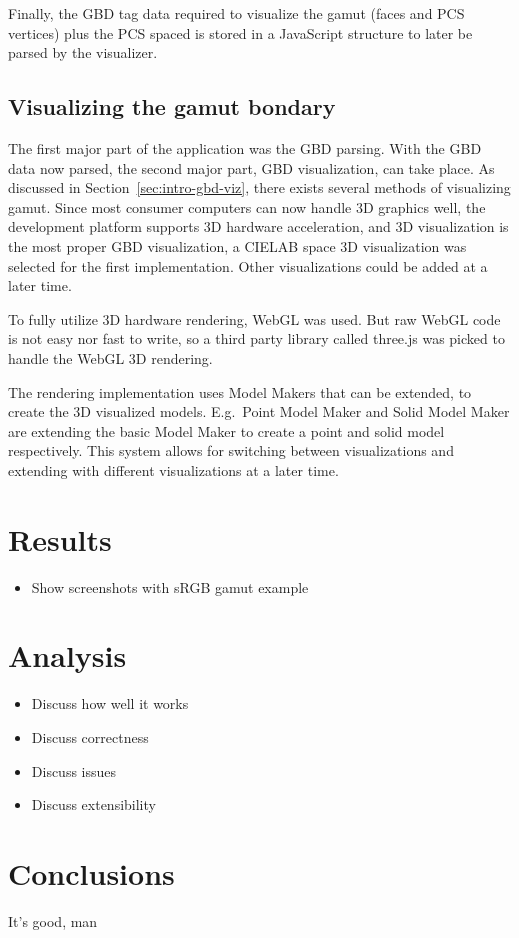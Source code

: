 Finally, the GBD tag data required to visualize the gamut (faces and PCS vertices) plus the PCS spaced is stored in a JavaScript structure to later be parsed by the visualizer.

\subsection{Visualizing the gamut bondary}
The first major part of the application was the GBD parsing.
With the GBD data now parsed, the second major part, GBD visualization, can take place.
As discussed in Section~\ref{sec:intro-gbd-viz}, there exists several methods of visualizing gamut.
Since most consumer computers can now handle 3D graphics well, the development platform supports 3D hardware acceleration, and 3D visualization is the most proper GBD visualization, a CIELAB space 3D visualization was selected for the first implementation.
Other visualizations could be added at a later time.

To fully utilize 3D hardware rendering, WebGL was used.
But raw WebGL code is not easy nor fast to write, so a third party library called three.js was picked to handle the WebGL 3D rendering.

The rendering implementation uses Model Makers that can be extended, to create the 3D visualized models.
E.g.\ Point Model Maker and Solid Model Maker are extending the basic Model Maker to create a point and solid model respectively.
This system allows for switching between visualizations and extending with different visualizations at a later time.



\section{Results}
\begin{itemize}
	\item Show screenshots with sRGB gamut example
\end{itemize}

\section{Analysis}
\begin{itemize}
	\item Discuss how well it works
	\item Discuss correctness
	\item Discuss issues
	\item Discuss extensibility
\end{itemize}

\section{Conclusions}
It's good, man

